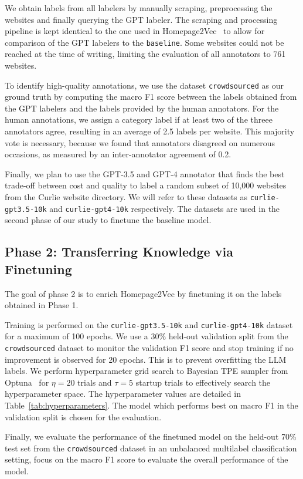 We obtain labels from all labelers by manually scraping, preprocessing the websites and finally querying the GPT labeler. The scraping and processing pipeline is kept identical to the one used in Homepage2Vec~\cite{homepage2vec} to allow for comparison of the GPT labelers to the \texttt{baseline}. Some websites could not be reached at the time of writing, limiting the evaluation of all annotators to 761 websites.

To identify high-quality annotations, we use the dataset \texttt{crowdsourced} as our ground truth by computing the macro F1 score between the labels obtained from the GPT labelers and the labels provided by the human annotators. For the human annotations, we assign a category label if at least two of the threee annotators agree, resulting in an average of 2.5 labels per website. This majority vote is necessary, because we found that annotators disagreed on numerous occasions, as measured by an inter-annotator agreement of 0.2.

Finally, we plan to use the GPT-3.5 and GPT-4 annotator that finds the best trade-off between cost and quality to label a random subset of 10,000 websites from the Curlie website directory. We will refer to these datasets as \texttt{curlie-gpt3.5-10k} and \texttt{curlie-gpt4-10k} respectively. The datasets are used in the second phase of our study to finetune the baseline model.

\subsection*{Phase 2: Transferring Knowledge via Finetuning}

The goal of phase 2 is to enrich Homepage2Vec by finetuning it on the labels obtained in Phase 1.

Training is performed on the \texttt{curlie-gpt3.5-10k} and \texttt{curlie-gpt4-10k} dataset for a maximum of 100 epochs. We use a 30\% held-out validation split from the \texttt{crowdsourced} dataset to monitor the validation F1 score and stop training if no improvement is observed for 20 epochs. This is to prevent overfitting the LLM labels. We perform hyperparameter grid search to Bayesian TPE sampler from Optuna~\cite{optuna} for $\eta=20$ trials and $\tau=5$ startup trials to effectively search the hyperparameter space. The hyperparameter values are detailed in Table~\ref{tab:hyperparameters}. The model which performs best on macro F1 in the validation split is chosen for the evaluation.



Finally, we evaluate the performance of the finetuned model on the held-out 70\% test set from the \texttt{crowdsourced} dataset in an unbalanced multilabel classification setting, focus on the macro F1 score to evaluate the overall performance of the model.
